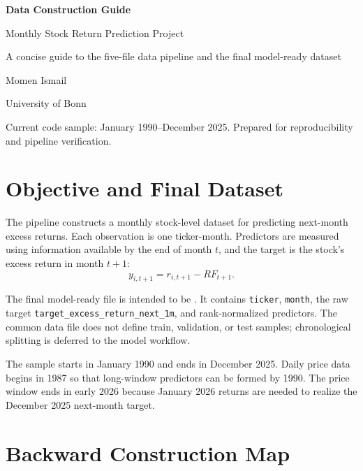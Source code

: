 \documentclass[11pt,a4paper]{article}
\newcommand{\code}[1]{\texttt{#1}}
\newcommand{\target}{\code{target\_excess\_return\_next\_1m}}
\begin{document}
\hypersetup{pageanchor=false}

\begin{titlepage}
\centering
\vspace*{3cm}
{\Huge\bfseries\color{navy} Data Construction Guide\par}
\vspace{0.5cm}
{\Large Monthly Stock Return Prediction Project\par}
\vspace{1.2cm}
{\large A concise guide to the five-file data pipeline and the final model-ready dataset\par}
\vfill
{\large Momen Ismail\par}
\vspace{0.2cm}
{\large University of Bonn\par}
\vfill
{\small Current code sample: January 1990--December 2025. Prepared for reproducibility and pipeline verification.}
\end{titlepage}

\tableofcontents
\newpage
{}
\hypersetup{pageanchor=true}

\section{Objective and Final Dataset}

The pipeline constructs a monthly stock-level dataset for predicting next-month excess returns. Each observation is one ticker-month. Predictors are measured using information available by the end of month $t$, and the target is the stock's excess return in month $t+1$:
\[
  y_{i,t+1}=r_{i,t+1}-RF_{t+1}.
\]

The final model-ready file is intended to be
.
It contains \code{ticker}, \code{month}, the raw target \target, and rank-normalized predictors. The common data file does not define train, validation, or test samples; chronological splitting is deferred to the model workflow.

The sample starts in January 1990 and ends in December 2025. Daily price data begins in 1987 so that long-window predictors can be formed by 1990. The price window ends in early 2026 because January 2026 returns are needed to realize the December 2025 next-month target.

\section{Backward Construction Map}
\end{document}
